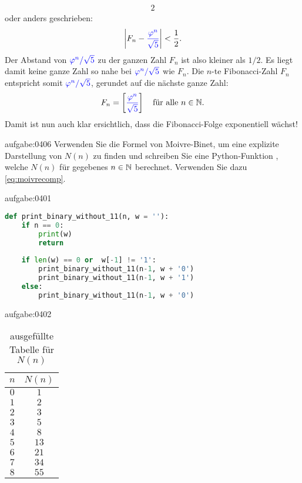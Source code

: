 {\begin{alignat*}{2}
\end{alignat*}
oder anders geschrieben:
\begin{align*}
    \left\lvert F_n-\textcolor{blue}{\frac{\varphi^n}{\sqrt{5}}}\right\rvert < \frac{1}{2}.
\end{align*}
Der Abstand von $\textcolor{Blue}{\varphi^n/\sqrt{5}}$ zu der ganzen Zahl $F_n$ ist also kleiner als $1/2$. Es liegt damit keine ganze Zahl so nahe bei $\textcolor{Blue}{\varphi^n/\sqrt{5}}$ wie $F_n$. Die $n$-te Fibonacci-Zahl $F_n$ entspricht somit $\textcolor{Blue}{\varphi^n/\sqrt{5}}$, gerundet auf die nächste ganze Zahl:
\begin{align}\label{eq:moivrecomp}
    F_n = \left[\textcolor{blue}{\frac{\varphi^n}{\sqrt{5}}}\right] \quad\text{für alle } n\in\mathbb{N}.
\end{align}
Damit ist nun auch klar ersichtlich, dass die Fibonacci-Folge exponentiell wächst!
}

\begin{aufgabe}{aufgabe:0406}
Verwenden Sie die Formel von Moivre-Binet, um eine explizite Darstellung von $N(n)$ zu finden und schreiben Sie eine Python-Funktion , welche $N(n)$ für gegebenes $n\in\mathbb{N}$ berechnet. Verwenden Sie dazu \cref{eq:moivrecomp}.
\end{aufgabe}

\begin{antwort}{aufgabe:0401}
\begin{lstlisting}[language=Python,caption=binäre Strings ohne $11$]
def print_binary_without_11(n, w = ''):
    if n == 0:
        print(w)
        return
    
    if len(w) == 0 or  w[-1] != '1':
        print_binary_without_11(n-1, w + '0')
        print_binary_without_11(n-1, w + '1')
    else:
        print_binary_without_11(n-1, w + '0')
\end{lstlisting}
\end{antwort}

\begin{antwort}{aufgabe:0402}
    \begin{table}[H]
        \begin{center}
        \begin{tabular}{c|c}
        $n$ & $N(n)$ \\ \hline
        $0$ & $1$ \\
        $1$ & $2$ \\ 
        $2$ & $3$ \\
        $3$ & $5$ \\
        $4$ & $8$ \\
        $5$ & $13$ \\ 
        $6$ & $21$ \\
        $7$ & $34$ \\
        $8$ & $55$ \\
        \end{tabular}
        \end{center}
        \caption{ausgefüllte Tabelle für $N(n)$}
        \label{table:Nncompleted}
    \end{table}
\end{antwort}


